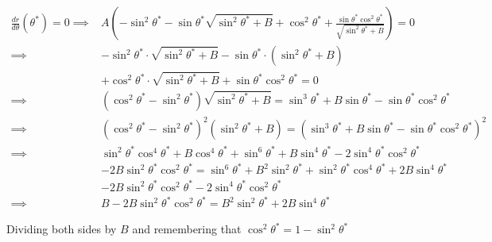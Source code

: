 \documentclass[a4paper,10pt]{article}
\begin{document}
\begin{equation}
    \begin{aligned}
        \frac{
            dr
        }{
            d\theta
        }(\theta^*) = 0
        \implies & A\left(
            -\sin^2\theta^*
            - \sin\theta^*\sqrt{
                \sin^2\theta^*
                + B
            }
            + \cos^2\theta^*
            + \frac{
                \sin\theta^*\cos^2\theta^*
            }{
                \sqrt{
                    \sin^2\theta^*
                    + B
                }
            }
        \right) = 0\\
        \implies & -\sin^2\theta^*\cdot\sqrt{
            \sin^2\theta^*
            + B
        }
        - \sin\theta^*\cdot\left(
            \sin^2\theta^*
            + B
        \right)\\
        & + \cos^2\theta^*\cdot\sqrt{
            \sin^2\theta^*
            + B
        }
        + \sin\theta^*\cos^2\theta^* = 0\\
        \implies & \left(
            \cos^2\theta^*
            - \sin^2\theta^*
        \right)
        \sqrt{
            \sin^2\theta^*
            + B
        }
        = \sin^3\theta^*
        + B\sin\theta^*
        - \sin\theta^*\cos^2\theta^*\\
        \implies & \left(
            \cos^2\theta^*
            - \sin^2\theta^*
        \right)^2\left(
            \sin^2\theta^*
            + B
        \right)
        = \left(
            \sin^3\theta^*
            + B\sin\theta^*
            - \sin\theta^*\cos^2\theta^*
        \right)^2\\
        \implies & \sin^2\theta^*\cos^4\theta^*
        + B\cos^4\theta^*
        + \sin^6\theta^*
        + B\sin^4\theta^*
        - 2\sin^4\theta^*\cos^2\theta^*\\
        & - 2B\sin^2\theta^*\cos^2\theta^*
        = \sin^6\theta^*
        + B^2\sin^2\theta^*
        + \sin^2\theta^*\cos^4\theta^*
        + 2B\sin^4\theta^*\\
        & - 2B\sin^2\theta^*\cos^2\theta^*
        - 2\sin^4\theta^*\cos^2\theta^*\\
        \implies & B
        - 2B\sin^2\theta^*\cos^2\theta^*
        = B^2\sin^2\theta^*
        + 2B\sin^4\theta^*
    \end{aligned}
\end{equation}

Dividing both sides by $B$
and remembering that $\cos^2\theta^* = 1-\sin^2\theta^*$
\end{document}
